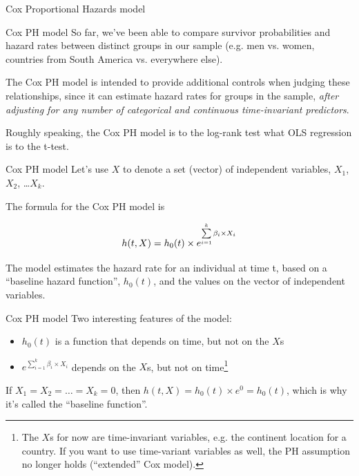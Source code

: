 \documentclass[12pt,english,pdf,xcolor=dvipsnames,aspectratio=169,handout]{beamer}\usepackage[]{graphicx}\usepackage[]{xcolor}
\begin{document}
\begin{frame}

\begin{center}
\huge Cox Proportional Hazards model
\end{center}
\end{frame}



\begin{frame}{Cox PH model}
So far, we've been able to compare survivor probabilities and hazard rates between distinct groups in our sample (e.g. men vs. women, countries from South America vs. everywhere else).\bigskip

The Cox PH model is intended to provide additional controls when judging these relationships, since it can estimate hazard rates for groups in the sample, \textit{after adjusting for any number of categorical and continuous time-invariant predictors}.\bigskip

Roughly speaking, the Cox PH model is to the log-rank test what OLS regression is to the t-test.
\end{frame}



\begin{frame}{Cox PH model}
Let's use $X$ to denote a set (vector) of independent variables, $X_1$, $X_2$, \dots $X_k$.\bigskip

The formula for the Cox PH model is

\begin{equation}
  \centering
  h(t,X)=h_0(t) \times e^{\sum\limits_{i=1}^k\beta_i \times X_i}
\end{equation}
\bigskip

The model estimates the hazard rate for an individual at time t, based on a ``baseline hazard function'', $h_0(t)$, and the values on the vector of independent variables.
\end{frame}



\begin{frame}{Cox PH model}
Two interesting features of the model:

\begin{itemize}
\item $h_0(t)$ is a function that depends on time, but not on the $X$s
\item $e^{\sum\limits_{i=1}^k\beta_i \times X_i}$ depends on the $X$s, but not on time\footnote{The $X$s for now are time-invariant variables, e.g. the continent location for a country. If you want to use time-variant variables as well, the PH assumption no longer holds (``extended'' Cox model).}
\end{itemize}
\bigskip

If $X_1=X_2=\dots=X_k=0$, then $h(t,X)=h_0(t) \times e^0=h_0(t)$, which is why it's called the ``baseline function''.
\end{frame}
\end{document}
